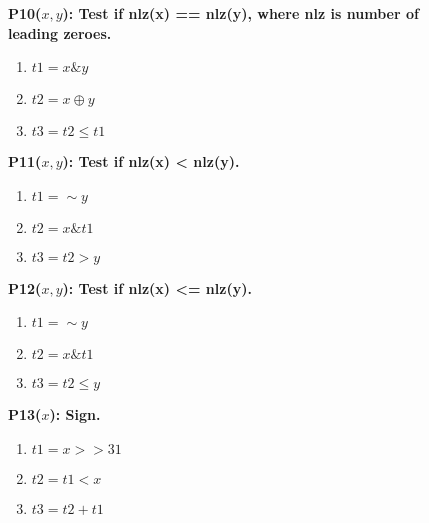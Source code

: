 \begin{figure}
\begin{multicols}{4}
      \vspace{12pt}
   
   \begin{minipage}{.2\textwidth}
   \bf{P10}($x, y$): Test if nlz(x) == nlz(y), where nlz is number of leading zeroes.
   \begin{enumerate}
    \item $t1 = x \& y$
    \item $t2 = x \oplus y$
    \item $t3 = t2 \leq t1$
   \end{enumerate}
   \end{minipage}

   
      \vspace{12pt}
   
   \begin{minipage}{.2\textwidth}
   \bf{P11}($x, y$): Test if nlz(x) < nlz(y).
   \begin{enumerate}
    \item $t1 = \sim y$
    \item $t2 = x \& t1$
    \item $t3 = t2 > y$
   \end{enumerate}
   \end{minipage}
   \vspace{12pt}
   
   \begin{minipage}{.2\textwidth}
   \bf{P12}($x, y$): Test if nlz(x) <= nlz(y).
   \begin{enumerate}
    \item $t1 = \sim y$
    \item $t2 = x \& t1$
    \item $t3 = t2 \leq y$
   \end{enumerate}
   \end{minipage}
   
      \vspace{12pt}
   
   \begin{minipage}{.2\textwidth}
   \bf{P13}($x$): Sign.
   \begin{enumerate}
    \item $t1 = x >> 31$
    \item $t2 = t1 < x$
    \item $t3 = t2 + t1$
   \end{enumerate}
   \end{minipage}

   \vspace{12pt}


\end{multicols}
\end{figure}
